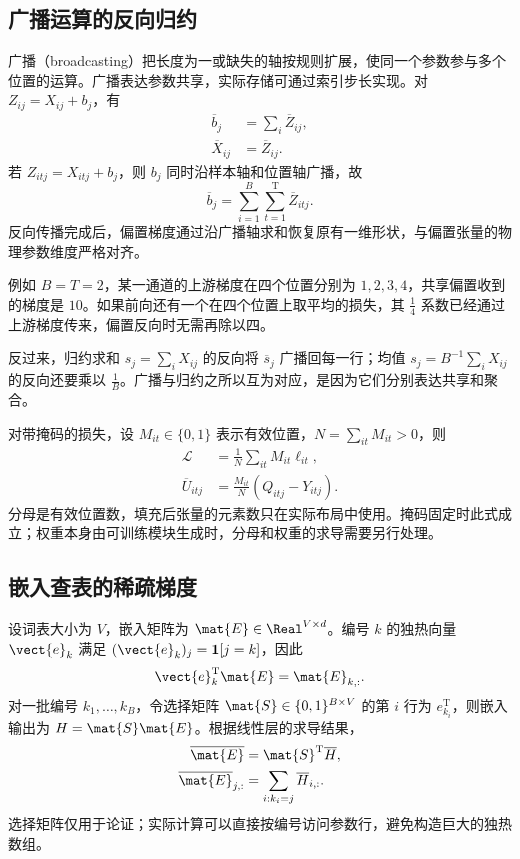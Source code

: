 \documentclass[../textbook.tex]{subfiles}
\begin{document}
\subsection{广播运算的反向归约}
广播（broadcasting）把长度为一或缺失的轴按规则扩展，使同一个参数参与多个位置的运算。广播表达参数共享，实际存储可通过索引步长实现。对 $Z_{ij}=X_{ij}+b_j$，有
\begin{equation}
\begin{aligned}
 \overline b_j &= \sum_i\overline Z_{ij}, \\
 \overline X_{ij} &= \overline Z_{ij}.
\end{aligned}
\end{equation}
若 $Z_{itj}=X_{itj}+b_j$，则 $b_j$ 同时沿样本轴和位置轴广播，故
\begin{equation}
 \overline b_j=\sum_{i=1}^{B}\sum_{t=1}^{\mathrm{T}}\overline Z_{itj}.
\end{equation}
反向传播完成后，偏置梯度通过沿广播轴求和恢复原有一维形状，与偏置张量的物理参数维度严格对齐。

例如 $B=T=2$，某一通道的上游梯度在四个位置分别为 $1,2,3,4$，共享偏置收到的梯度是 $10$。如果前向还有一个在四个位置上取平均的损失，其 $\frac{1}{4}$ 系数已经通过上游梯度传来，偏置反向时无需再除以四。

反过来，归约求和 $s_j=\sum_iX_{ij}$ 的反向将 $\overline s_j$ 广播回每一行；均值 $s_j=B^{-1}\sum_iX_{ij}$ 的反向还要乘以 $\frac{1}{B}$。广播与归约之所以互为对应，是因为它们分别表达共享和聚合。

对带掩码的损失，设 $M_{it}\in\{0,1\}$ 表示有效位置，$N=\sum_{it}M_{it}>0$，则
\begin{equation}
\begin{aligned}
 \mathcal L &= \frac1N\sum_{it}M_{it}\ell_{it}, \\
 \overline U_{itj} &= \frac{M_{it}}{N}(Q_{itj}-Y_{itj}).
\end{aligned}
\end{equation}
分母是有效位置数，填充后张量的元素数只在实际布局中使用。掩码固定时此式成立；权重本身由可训练模块生成时，分母和权重的求导需要另行处理。

\subsection{嵌入查表的稀疏梯度}
设词表大小为 $V$，嵌入矩阵为 $\mat{E}\in\Real^{V\times d}$。编号 $k$ 的独热向量 $\vect{e}_k$ 满足 $(\vect{e}_k)_j=\mathbf1[j=k]$，因此
\begin{equation}
 \vect{e}_k^{\mathrm{T}}\mat{E}=\mat{E}_{k,:}.
\end{equation}
对一批编号 $k_1,\ldots,k_B$，令选择矩阵 $\mat{S}\in\{0,1\}^{B\times V}$ 的第 $i$ 行为 $e_{k_i}^{\mathrm{T}}$，则嵌入输出为 $H=\mat{S}\mat{E}$。根据线性层的求导结果，
\begin{equation}\label{eq:tensor-embedding}
\begin{aligned}
 \overline{\mat{E}} &= \mat{S}^{\mathrm{T}}\overline H, \\
 \overline{\mat{E}}_{j,:} &= \sum_{i:k_i=j}\overline H_{i,:}.
\end{aligned}
\end{equation}
选择矩阵仅用于论证；实际计算可以直接按编号访问参数行，避免构造巨大的独热数组。
\end{document}
